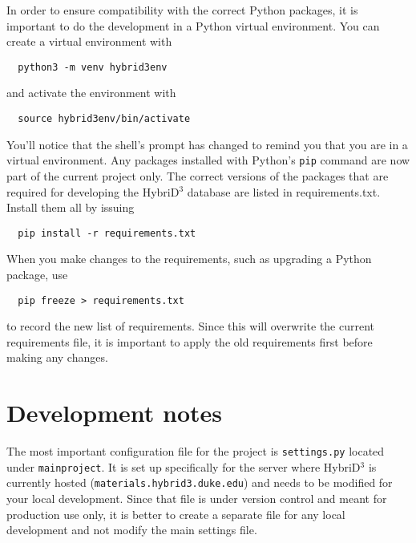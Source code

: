 \documentclass{article}
\begin{document}
In order to ensure compatibility with the correct Python packages, it is important to do the development in a Python virtual environment. You can create a virtual environment with
\begin{lstlisting}
  python3 -m venv hybrid3env
\end{lstlisting}
and activate the environment with
\begin{lstlisting}
  source hybrid3env/bin/activate
\end{lstlisting}
You'll notice that the shell's prompt has changed to remind you that you are in a virtual environment. Any packages installed with Python's \verb+pip+ command are now part of the current project only. The correct versions of the packages that are required for developing the HybriD$^3$ database are listed in requirements.txt. Install them all by issuing
\begin{lstlisting}
  pip install -r requirements.txt
\end{lstlisting}
When you make changes to the requirements, such as upgrading a Python package, use
\begin{lstlisting}
  pip freeze > requirements.txt
\end{lstlisting}
to record the new list of requirements. Since this will overwrite the current requirements file, it is important to apply the old requirements first before making any changes.

\section{Development notes}

The most important configuration file for the project is \texttt{settings.py} located under \texttt{mainproject}. It is set up specifically for the server where HybriD$^3$ is currently hosted (\texttt{materials.hybrid3.duke.edu}) and needs to be modified for your local development. Since that file is under version control and meant for production use only, it is better to create a separate file for any local development and not modify the main settings file.
\end{document}

